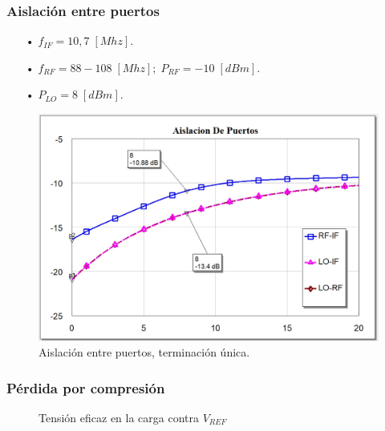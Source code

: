 \documentclass[twocolumn]{article}
\begin{document}
\subsubsection{Aislación entre puertos}
%
\begin{itemize}\itemsep0em
\item[•]  $f_{IF} = 10,7 \; [Mhz]$.
\item[•]  $f_{RF} = 88-108 \; [Mhz]; \; P_{RF} = -10 \; [dBm]$.
\item[•]  $P_{LO} = 8 \;[dBm]$.
\end{itemize}
%
\begin{figure}[h]
  \centering    
	\includegraphics[width=\columnwidth]{imagenes/ISO1.jpg}
	\caption{Aislación entre puertos, terminación única.}\label{fig:ISO1}
\end{figure}
\clearpage
%
\subsubsection{Pérdida por compresión}
\begin{figure}[h!]
\centering
{}
	\caption{Tensión eficaz en la carga contra $V_{REF}$ }
\end{figure}
\end{document}
